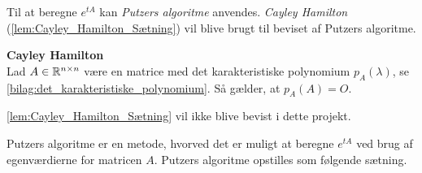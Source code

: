 Til at beregne $e^{tA}$ kan \textit{Putzers algoritme} anvendes.  
\textit{Cayley Hamilton} (\autoref{lem:Cayley_Hamilton_Sætning}) vil blive brugt til beviset af Putzers algoritme. 
\begin{lem}\textbf{Cayley Hamilton}\label{lem:Cayley_Hamilton_Sætning}\\
Lad $A \in \mathbb{R}^{n\times n}$ være en matrice med det karakteristiske polynomium $p_A(\lambda)$, se \autoref{bilag:det_karakteristiske_polynomium}. Så gælder, at $p_A(A) = \textit{O}$.
\end{lem}
\autoref{lem:Cayley_Hamilton_Sætning} vil ikke blive bevist i dette projekt. 

Putzers algoritme er en metode, hvorved det er muligt at beregne $e^{tA}$ ved brug af egenværdierne for matricen $A$. Putzers algoritme opstilles som følgende sætning.

